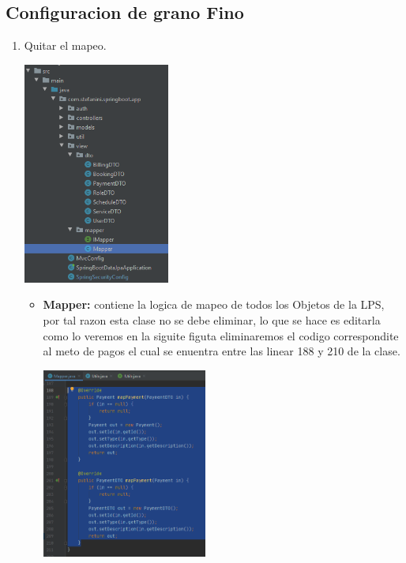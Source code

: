 \documentclass[10pt,a4paper,openany]{book}
\begin{document}
\subsection{Configuracion de grano Fino}
\begin{enumerate}
\item Quitar el mapeo.\\
\begin{center}
\includegraphics[width=0.38\textwidth]{conBk4}
\end{center}
\begin{itemize}
	\item \textbf{Mapper:} contiene la logica de mapeo de todos los Objetos de la LPS, por tal razon esta clase no se debe eliminar, lo que se hace es editarla como lo veremos en la siguite figuta eliminaremos el codigo correspondite al meto de pagos el cual se enuentra entre las linear 188 y 210 de la clase.
	\begin{center}
	\includegraphics[width=0.45\textwidth]{conBk5}
	\end{center}
\end{itemize}
\end{enumerate}
\end{document}
